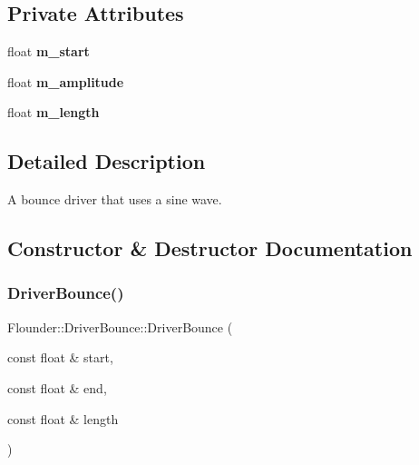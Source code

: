 \subsection*{Private Attributes}
\begin{DoxyCompactItemize}
\item 
\mbox{\label{class_flounder_1_1_driver_bounce_a458ce238b5360f27f19e203c9fdacc59}} 
float {\bfseries m\+\_\+start}
\item 
\mbox{\label{class_flounder_1_1_driver_bounce_aa6515758d3b01ec8c92a7ec2c6fb3dc1}} 
float {\bfseries m\+\_\+amplitude}
\item 
\mbox{\label{class_flounder_1_1_driver_bounce_a4536025465c80c2788b28c89f689d454}} 
float {\bfseries m\+\_\+length}
\end{DoxyCompactItemize}


\subsection{Detailed Description}
A bounce driver that uses a sine wave. 



\subsection{Constructor \& Destructor Documentation}
\mbox{\label{class_flounder_1_1_driver_bounce_a41ee701fe3125026a5012e098497ea23}} 
\subsubsection{\texorpdfstring{Driver\+Bounce()}{DriverBounce()}}
{\footnotesize\ttfamily Flounder\+::\+Driver\+Bounce\+::\+Driver\+Bounce (\begin{DoxyParamCaption}\item[{const float \&}]{start,  }\item[{const float \&}]{end,  }\item[{const float \&}]{length }\end{DoxyParamCaption})}



